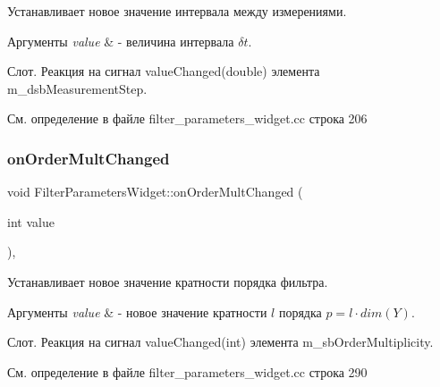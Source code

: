 Устанавливает новое значение интервала между измерениями. 


\begin{DoxyParams}{Аргументы}
{\em value} & -\/ величина интервала $\delta t$.\\
\hline
\end{DoxyParams}
Слот. Реакция на сигнал value\+Changed(double) элемента m\+\_\+dsb\+Measurement\+Step. 

См. определение в файле filter\+\_\+parameters\+\_\+widget.\+cc строка 206

\hypertarget{class_filter_parameters_widget_adacd531098565f7b21bd8d958a35fa74}{}\label{class_filter_parameters_widget_adacd531098565f7b21bd8d958a35fa74} 
\subsubsection{\texorpdfstring{on\+Order\+Mult\+Changed}{onOrderMultChanged}}
{\footnotesize\ttfamily void Filter\+Parameters\+Widget\+::on\+Order\+Mult\+Changed (\begin{DoxyParamCaption}\item[{int}]{value }\end{DoxyParamCaption})\hspace{0.3cm}{\ttfamily [private]}, {\ttfamily [slot]}}



Устанавливает новое значение кратности порядка фильтра. 


\begin{DoxyParams}{Аргументы}
{\em value} & -\/ новое значение кратности $l$ порядка $p = l\cdot dim(Y)$.\\
\hline
\end{DoxyParams}
Слот. Реакция на сигнал value\+Changed(int) элемента m\+\_\+sb\+Order\+Multiplicity. 

См. определение в файле filter\+\_\+parameters\+\_\+widget.\+cc строка 290

\hypertarget{class_filter_parameters_widget_a4c0b14d9be53fd4b45179037e09c33b3}{}\label{class_filter_parameters_widget_a4c0b14d9be53fd4b45179037e09c33b3} 

